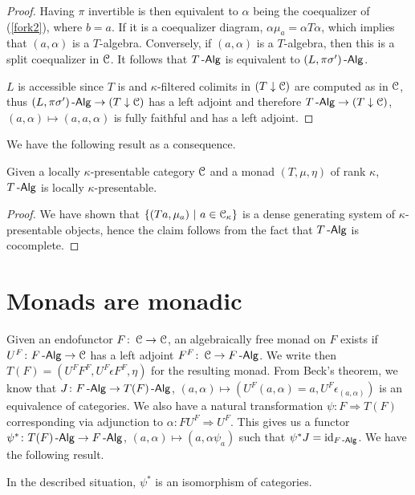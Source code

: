 \documentclass[a4paper,11pt,oneside,openany]{scrbook}
\begin{document}
\begin{proof}
	Having $\pi$ invertible is then equivalent to $\alpha$ being the coequalizer of (\ref{fork2}), where $b=a$. If it is a coequalizer diagram, $\alpha\mu_a=\alpha T\alpha$, which implies that $(a,\alpha)$ is a $T$-algebra. Conversely, if $(a,\alpha)$ is a $T$-algebra, then this is a split coequalizer in $\operatorname{\mathcal{C}}$. It follows that $T\operatorname{-\mathsf{Alg}}$ is equivalent to $(L,\pi\sigma')\operatorname{-\mathsf{Alg}}$.

	$L$ is accessible since $T$ is and $\kappa$-filtered colimits in $(T\downarrow\operatorname{\mathcal{C}})$ are computed as in $\operatorname{\mathcal{C}}$, thus $(L,\pi\sigma')\operatorname{-\mathsf{Alg}}\rightarrow(T\downarrow\operatorname{\mathcal{C}})$ has a left adjoint and therefore $T\operatorname{-\mathsf{Alg}}\rightarrow (T\downarrow\operatorname{\mathcal{C}})$, $(a,\alpha)\mapsto(a,a,\alpha)$ is fully faithful and has a left adjoint.
\end{proof}

We have the following result as a consequence.

\begin{thm}
	Given a locally $\kappa$-presentable category $\operatorname{\mathcal{C}}$ and a monad $(T,\mu,\eta)$ of rank $\kappa$, $T\operatorname{-\mathsf{Alg}}$ is locally $\kappa$-presentable.
\end{thm}

\begin{proof}
	We have shown that $\{(Ta,\mu_a)\ |\ a\in\operatorname{\mathcal{C}}_\kappa\}$ is a dense generating system of $\kappa$-presentable objects, hence the claim follows from the fact that $T\operatorname{-\mathsf{Alg}}$ is cocomplete.
\end{proof}

\section{Monads are monadic}

Given an endofunctor $F\colon\operatorname{\mathcal{C}}\rightarrow\operatorname{\mathcal{C}}$, an algebraically free monad on
$F$ exists if $U^F\colon F\operatorname{-\mathsf{Alg}}\rightarrow\operatorname{\mathcal{C}}$ has a left adjoint
$F^F\colon\operatorname{\mathcal{C}}\rightarrow F\operatorname{-\mathsf{Alg}}$. We write then $T(F)=(U^FF^F,U^F\epsilon
F^F,\eta)$ for the resulting monad. From Beck's theorem, we know that $J\colon
F\operatorname{-\mathsf{Alg}}\rightarrow T(F)\operatorname{-\mathsf{Alg}}$, $(a,\alpha)\mapsto
(U^F(a,\alpha)=a,U^F\epsilon_{(a,\alpha)})$ is an equivalence of categories. We
also have a natural transformation $\psi\colon F\Rightarrow T(F)$ corresponding
via adjunction to $\alpha\colon FU^F\Rightarrow U^F$. This gives us a functor
$\psi^*\colon T(F)\operatorname{-\mathsf{Alg}}\rightarrow F\operatorname{-\mathsf{Alg}}$, $(a,\alpha)\mapsto (a,\alpha\psi_a)$
such that $\psi^* J=\operatorname{id}_{F\operatorname{-\mathsf{Alg}}}$. We have the following result.

\begin{prop}
	In the described situation, $\psi^*$ is an isomorphism of categories.
\end{prop}
\end{document}
